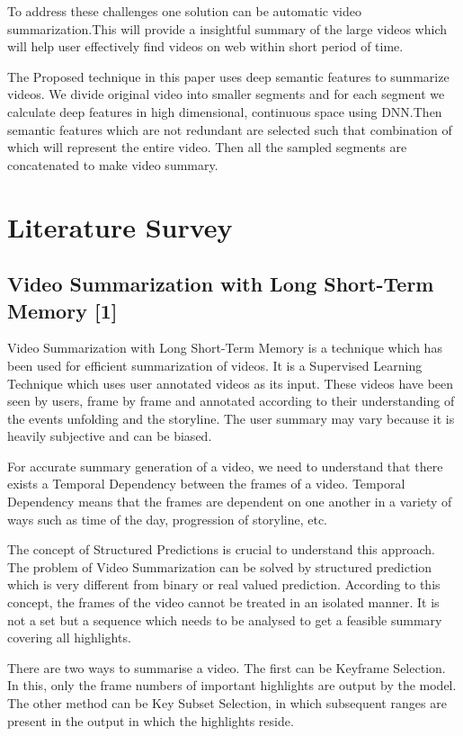 \documentclass[twocolumn,showpacs,%
  nofootinbib,aps,superscriptaddress,%
  eqsecnum,prd,notitlepage,showkeys,10pt]{revtex4-1}
\begin{document}
To address these challenges one solution can be automatic video summarization.This will provide a insightful summary of the large videos which will help user effectively find videos on web within short period of time.

The Proposed technique in this paper uses deep semantic features to summarize videos. We divide original video into smaller segments and for each segment we calculate deep features in high dimensional, continuous space using DNN.Then semantic features which are not redundant are selected such that combination of which will represent the entire video. Then all the sampled segments are concatenated to make video summary.

\section{Literature Survey}

\subsection{
Video Summarization with Long Short-Term Memory [1]
}
Video Summarization with Long Short-Term Memory is a technique which has been used for efficient summarization of videos. It is a Supervised Learning Technique which uses user annotated videos as its input. These videos have been seen by users, frame by frame and annotated according to their understanding of the events unfolding and the storyline. The user summary may vary because it is heavily subjective and can be biased.

For accurate summary generation of a video, we need to understand that there exists a Temporal Dependency between the frames of a video. Temporal Dependency means that the frames are dependent on one another in a variety of ways such as time of the day, progression of storyline, etc.

The concept of Structured Predictions is crucial to understand this approach. The problem of Video Summarization can be solved by structured prediction which is very different from binary or real valued prediction. According to this concept, the frames of the video cannot be treated in an isolated manner. It is not a set but a sequence which needs to be analysed to get a feasible summary covering all highlights.

There are two ways to summarise a video. The first can be Keyframe Selection. In this, only the frame numbers of important highlights are output by the model. The other method can be Key Subset Selection, in which subsequent ranges are present in the output in which the highlights reside.
\end{document}
